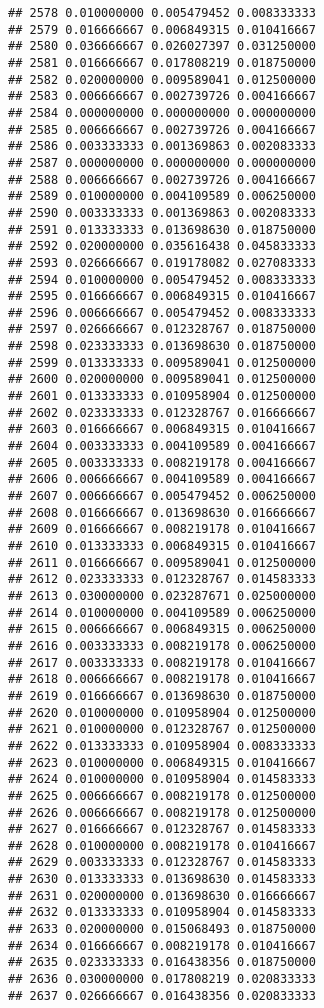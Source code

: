\documentclass[
]{article}
\begin{document}
\begin{verbatim}
## 2578 0.010000000 0.005479452 0.008333333
## 2579 0.016666667 0.006849315 0.010416667
## 2580 0.036666667 0.026027397 0.031250000
## 2581 0.016666667 0.017808219 0.018750000
## 2582 0.020000000 0.009589041 0.012500000
## 2583 0.006666667 0.002739726 0.004166667
## 2584 0.000000000 0.000000000 0.000000000
## 2585 0.006666667 0.002739726 0.004166667
## 2586 0.003333333 0.001369863 0.002083333
## 2587 0.000000000 0.000000000 0.000000000
## 2588 0.006666667 0.002739726 0.004166667
## 2589 0.010000000 0.004109589 0.006250000
## 2590 0.003333333 0.001369863 0.002083333
## 2591 0.013333333 0.013698630 0.018750000
## 2592 0.020000000 0.035616438 0.045833333
## 2593 0.026666667 0.019178082 0.027083333
## 2594 0.010000000 0.005479452 0.008333333
## 2595 0.016666667 0.006849315 0.010416667
## 2596 0.006666667 0.005479452 0.008333333
## 2597 0.026666667 0.012328767 0.018750000
## 2598 0.023333333 0.013698630 0.018750000
## 2599 0.013333333 0.009589041 0.012500000
## 2600 0.020000000 0.009589041 0.012500000
## 2601 0.013333333 0.010958904 0.012500000
## 2602 0.023333333 0.012328767 0.016666667
## 2603 0.016666667 0.006849315 0.010416667
## 2604 0.003333333 0.004109589 0.004166667
## 2605 0.003333333 0.008219178 0.004166667
## 2606 0.006666667 0.004109589 0.004166667
## 2607 0.006666667 0.005479452 0.006250000
## 2608 0.016666667 0.013698630 0.016666667
## 2609 0.016666667 0.008219178 0.010416667
## 2610 0.013333333 0.006849315 0.010416667
## 2611 0.016666667 0.009589041 0.012500000
## 2612 0.023333333 0.012328767 0.014583333
## 2613 0.030000000 0.023287671 0.025000000
## 2614 0.010000000 0.004109589 0.006250000
## 2615 0.006666667 0.006849315 0.006250000
## 2616 0.003333333 0.008219178 0.006250000
## 2617 0.003333333 0.008219178 0.010416667
## 2618 0.006666667 0.008219178 0.010416667
## 2619 0.016666667 0.013698630 0.018750000
## 2620 0.010000000 0.010958904 0.012500000
## 2621 0.010000000 0.012328767 0.012500000
## 2622 0.013333333 0.010958904 0.008333333
## 2623 0.010000000 0.006849315 0.010416667
## 2624 0.010000000 0.010958904 0.014583333
## 2625 0.006666667 0.008219178 0.012500000
## 2626 0.006666667 0.008219178 0.012500000
## 2627 0.016666667 0.012328767 0.014583333
## 2628 0.010000000 0.008219178 0.010416667
## 2629 0.003333333 0.012328767 0.014583333
## 2630 0.013333333 0.013698630 0.014583333
## 2631 0.020000000 0.013698630 0.016666667
## 2632 0.013333333 0.010958904 0.014583333
## 2633 0.020000000 0.015068493 0.018750000
## 2634 0.016666667 0.008219178 0.010416667
## 2635 0.023333333 0.016438356 0.018750000
## 2636 0.030000000 0.017808219 0.020833333
## 2637 0.026666667 0.016438356 0.020833333

\end{verbatim}
\end{document}
